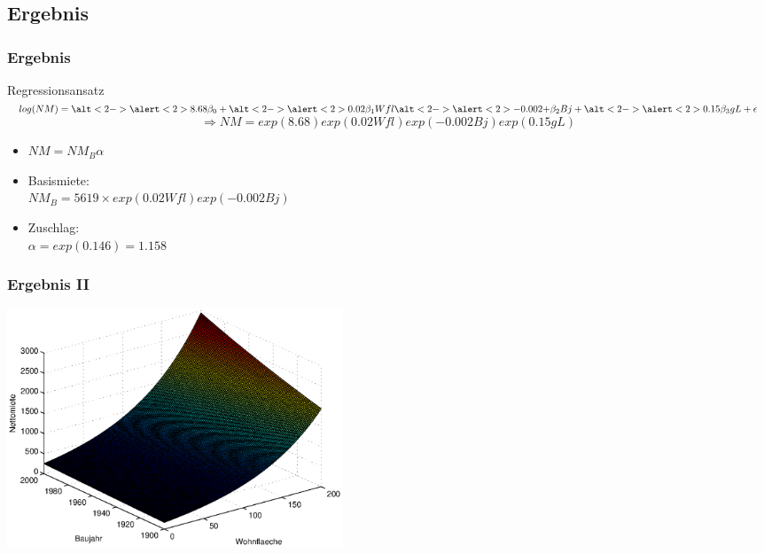 \documentclass{beamer}
\begin{document}
\subsection{Ergebnis}

\begin{frame}
  \frametitle{Ergebnis}
  \begin{block}{Regressionsansatz}
    \centering
    $ log(NM) = \alt<2->{\alert<2>{8.68}}{\beta_0} + \alt<2->{\alert<2>{0.02}}{\beta_1} Wfl \alt<2->{\alert<2>{- 0.002}}{+ \beta_2} Bj + \alt<2->{\alert<2>{0.15}}{\beta_3} gL + \epsilon $
      \pause\pause
    \[ \Rightarrow NM = exp(8.68) exp(0.02 Wfl) exp(-0.002 Bj) exp(0.15 gL) \]
        
  \end{block}

  \pause

  \begin{itemize}
  \item $NM = NM_B \alpha$
  \item Basismiete: \\
    $NM_B = 5619 \times exp(0.02 Wfl) exp(-0.002 Bj)$ \\
  \item Zuschlag: \\
    $\alpha = exp(0.146) = 1.158$ \\
  \end{itemize}
\end{frame}

\begin{frame}
  \frametitle{Ergebnis II}
  \begin{center}
    \includegraphics[width=10cm]{figures/nm_wfl_bj_log_approach}
  \end{center}

\end{frame}
\end{document}
